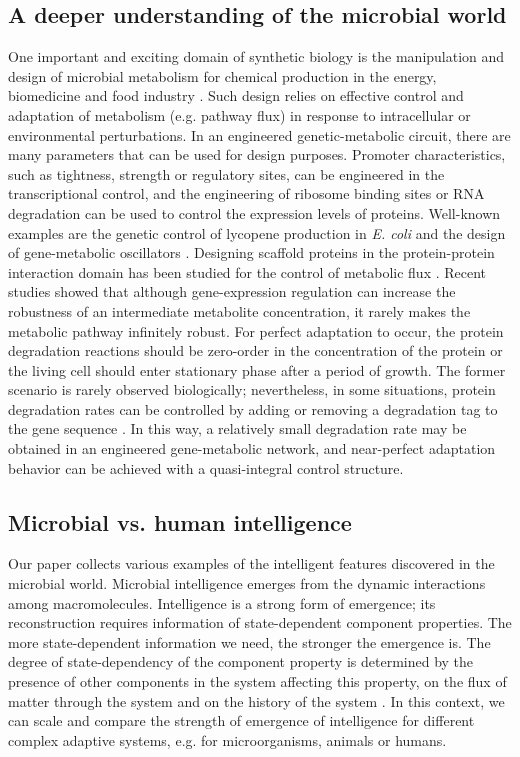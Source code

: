 \subsection{A deeper understanding of the microbial world}

One important and exciting domain of synthetic biology is the manipulation and design of microbial metabolism for chemical production in the energy, biomedicine and food industry \cite{purnick_second_2009}. Such design relies on effective control and adaptation of metabolism (e.g. pathway flux) in response to intracellular or environmental perturbations. In an engineered genetic-metabolic circuit, there are many parameters that can be used for design purposes. Promoter characteristics, such as tightness, strength or regulatory sites, can be engineered in the transcriptional control, and the engineering of ribosome binding sites or RNA degradation can be used to control the expression levels of proteins. Well-known examples are the genetic control of lycopene production in \textit{E. coli} \cite{farmer_improving_2000} and the design of gene-metabolic oscillators \cite{fung_synthetic_2005,stricker_fast_2008}. Designing scaffold proteins in the protein-protein interaction domain has been studied for the control of metabolic flux \cite{dueber_synthetic_2009}. Recent studies \cite{he_imperfect_2013,h._v._westerhoff_understanding_2014} showed that although gene-expression regulation can increase the robustness of an intermediate metabolite concentration, it rarely makes the metabolic pathway infinitely robust. For perfect adaptation to occur, the protein degradation reactions should be zero-order in the concentration of the protein or the living cell should enter stationary phase after a period of growth. The former scenario is rarely observed biologically; nevertheless, in some situations, protein degradation rates can be controlled by adding or removing a degradation tag to the gene sequence \cite{mcginness_engineering_2006}. In this way, a relatively small degradation rate may be obtained in an engineered gene-metabolic network, and near-perfect adaptation behavior can be achieved with a quasi-integral control structure. 

\subsection{Microbial vs. human intelligence}

Our paper collects various examples of the intelligent features discovered in the microbial world. Microbial intelligence emerges from the dynamic interactions among macromolecules. Intelligence is a strong form of emergence; its reconstruction requires information of state-dependent component properties. The more state-dependent information we need, the stronger the emergence is. The degree of state-dependency of the component property is determined by the presence of other components in the system affecting this property, on the flux of matter through the system and on the history of the system \cite{kolodkin_emergence_2012,kolodkin_understanding_2012,kolodkin_computing_2013}. In this context, we can scale and compare the strength of emergence of intelligence for different complex adaptive systems, e.g. for microorganisms, animals or humans.

